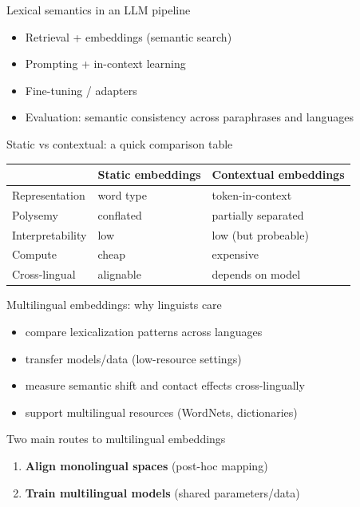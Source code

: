 \documentclass{beamer}
\begin{document}
\begin{frame}{Lexical semantics in an LLM pipeline}
\begin{itemize}
  \item Retrieval + embeddings (semantic search)
  \item Prompting + in-context learning
  \item Fine-tuning / adapters
  \item Evaluation: semantic consistency across paraphrases and languages
\end{itemize}
\end{frame}

\begin{frame}{Static vs contextual: a quick comparison table}
\begin{tabular}{@{}lll@{}}
\toprule
 & Static embeddings & Contextual embeddings \\
\midrule
Representation & word type & token-in-context \\
Polysemy & conflated & partially separated \\
Interpretability & low & low (but probeable) \\
Compute & cheap & expensive \\
Cross-lingual & alignable & depends on model \\
\bottomrule
\end{tabular}
\end{frame}

\begin{frame}{Multilingual embeddings: why linguists care}
\begin{itemize}
  \item compare lexicalization patterns across languages
  \item transfer models/data (low-resource settings)
  \item measure semantic shift and contact effects cross-lingually
  \item support multilingual resources (WordNets, dictionaries)
\end{itemize}
\end{frame}

\begin{frame}{Two main routes to multilingual embeddings}
\begin{enumerate}
  \item \textbf{Align monolingual spaces} (post-hoc mapping)
  \item \textbf{Train multilingual models} (shared parameters/data)
\end{enumerate}
\end{frame}
\end{document}
